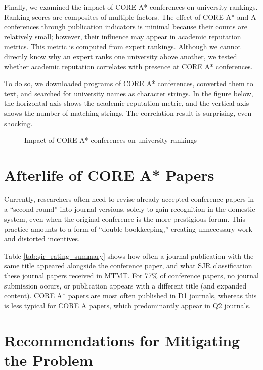 \documentclass[12pt,a4paper]{article}
\begin{document}
Finally, we examined the impact of CORE A\!* conferences on university rankings. Ranking scores are composites of multiple factors. The effect of CORE A\!* and A conferences through publication indicators is minimal because their counts are relatively small; however, their influence may appear in academic reputation metrics. This metric is computed from expert rankings. Although we cannot directly know why an expert ranks one university above another, we tested whether academic reputation correlates with presence at CORE A\!* conferences.

To do so, we downloaded programs of CORE A\!* conferences, converted them to text, and searched for university names as character strings. In the figure below, the horizontal axis shows the academic reputation metric, and the vertical axis shows the number of matching strings. The correlation result is surprising, even shocking.

\begin{figure}[h]
  \centering
  
  \caption{Impact of CORE A\!* conferences on university rankings}
\end{figure}

\section{Afterlife of CORE A\!* Papers}

Currently, researchers often need to revise already accepted conference papers in a ``second round'' into journal versions, solely to gain recognition in the domestic system, even when the original conference is the more prestigious forum. This practice amounts to a form of ``double bookkeeping,'' creating unnecessary work and distorted incentives.

Table \ref{tab:sjr_rating_summary} shows how often a journal publication with the same title appeared alongside the conference paper, and what SJR classification these journal papers received in MTMT. For 77\% of conference papers, no journal submission occurs, or publication appears with a different title (and expanded content). CORE A\!* papers are most often published in D1 journals, whereas this is less typical for CORE A papers, which predominantly appear in Q2 journals.



\section{Recommendations for Mitigating the Problem}\label{sec:javaslat}
\end{document}
